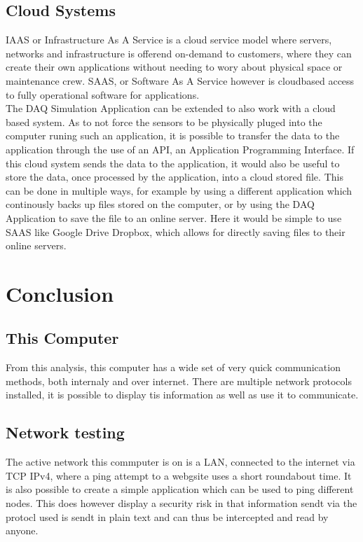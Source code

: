 \documentclass[11pt, A4paper, english]{article}
\begin{document}
		\subsection{Cloud Systems}
IAAS or Infrastructure As A Service is a cloud service model where servers, networks and infrastructure is offerend on-demand to customers, where they can create their own applications without needing to wory about physical space or maintenance crew. SAAS, or Software As A Service however is cloudbased access to fully operational software for applications. \\
The DAQ Simulation Application can be extended to also work with a cloud based system. As to not force the sensors to be physically pluged into the computer runing such an application, it is possible to transfer the data to the application through the use of an API, an Application Programming Interface. If this cloud system sends the data to the application, it would also be useful to store the data, once processed by the application, into a cloud stored file. This can be done in multiple ways, for example by using a different application which continously backs up files stored on the computer, or by using the DAQ Application to save the file to an online server. Here it would be simple to use SAAS like Google Drive Dropbox, which allows for directly saving files to their online servers.


	\section{Conclusion}
		\subsection{This Computer}
From this analysis, this computer has a wide set of very quick communication methods, both internaly and over internet. There are multiple network protocols installed, it is possible to display tis information as well as use it to communicate.
		
		\subsection{Network testing}
The active network this commputer is on is a LAN, connected to the internet via TCP IPv4, where a ping attempt to a webgsite uses a short roundabout time. It is also possible to create a simple application which can be used to ping different nodes. This does however display a security risk in that information sendt via the protocl used is sendt in plain text and can thus be intercepted and read by anyone.
		
\end{document}

